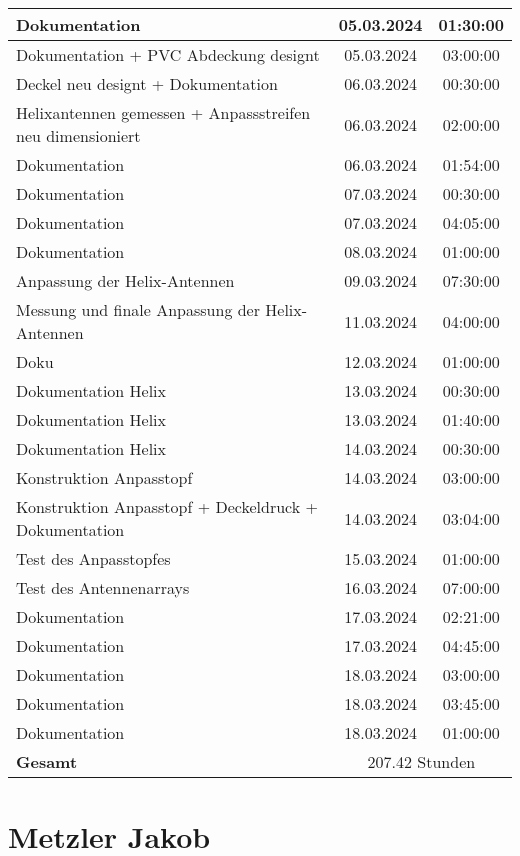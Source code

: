 \begin{longtable}{|l|c|c|}
	\hline
	Dokumentation & 05.03.2024 & 01:30:00 \\
	\hline
	Dokumentation + PVC Abdeckung designt & 05.03.2024 & 03:00:00 \\
	\hline
	Deckel neu designt + Dokumentation & 06.03.2024 & 00:30:00 \\
	\hline
	Helixantennen gemessen + Anpassstreifen neu dimensioniert & 06.03.2024 & 02:00:00 \\
	\hline
	Dokumentation & 06.03.2024 & 01:54:00 \\
	\hline
	Dokumentation & 07.03.2024 & 00:30:00 \\
	\hline
	Dokumentation & 07.03.2024 & 04:05:00 \\
	\hline
	Dokumentation & 08.03.2024 & 01:00:00 \\
	\hline
	Anpassung der Helix-Antennen & 09.03.2024 & 07:30:00 \\
	\hline
	Messung und finale Anpassung der Helix-Antennen & 11.03.2024 & 04:00:00 \\
	\hline
	Doku & 12.03.2024 & 01:00:00 \\
	\hline
	Dokumentation Helix & 13.03.2024 & 00:30:00 \\
	\hline
	Dokumentation Helix & 13.03.2024 & 01:40:00 \\
	\hline
	Dokumentation Helix & 14.03.2024 & 00:30:00 \\
	\hline
	Konstruktion Anpasstopf & 14.03.2024 & 03:00:00 \\
	\hline
	Konstruktion Anpasstopf + Deckeldruck + Dokumentation & 14.03.2024 & 03:04:00 \\
	\hline
	Test des Anpasstopfes & 15.03.2024 & 01:00:00 \\
	\hline
	Test des Antennenarrays & 16.03.2024 & 07:00:00 \\
	\hline
	Dokumentation & 17.03.2024 & 02:21:00 \\
	\hline
	Dokumentation & 17.03.2024 & 04:45:00 \\
	\hline
	Dokumentation & 18.03.2024 & 03:00:00 \\
	\hline
	Dokumentation & 18.03.2024 & 03:45:00 \\
	\hline
	Dokumentation & 18.03.2024 & 01:00:00 \\
	\hhline{|===|}
	\textbf{Gesamt} & \multicolumn{2}{c|}{207.42 Stunden} \\
	\hline
\end{longtable}

\section{Metzler Jakob}

